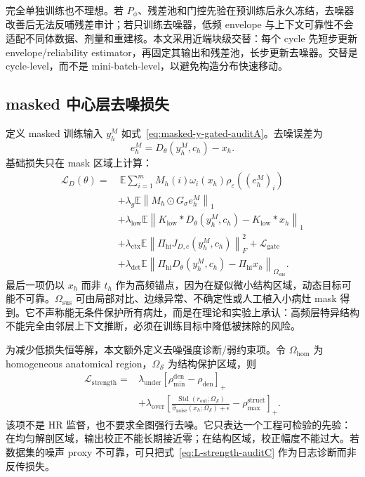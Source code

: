 \documentclass[11pt,a4paper,UTF8,fontset=fandol]{ctexart}
\theoremstyle{definition}
\DeclareMathOperator{\Std}{Std}
\newcommand{\norm}[1]{\left\lVert#1\right\rVert}
\newcommand{\E}{\mathbb{E}}
\newcommand{\cL}{\mathcal{L}}
\begin{document}
完全单独训练也不理想。若 $P_\phi$、残差池和门控先验在预训练后永久冻结，去噪器改善后无法反哺残差审计；若只训练去噪器，低频 envelope 与上下文可靠性不会适配不同体数据、剂量和重建核。本文采用近端块级交替：每个 cycle 先短步更新 envelope/reliability estimator，再固定其输出和残差池，长步更新去噪器。交替是 cycle-level，而不是 mini-batch-level，以避免构造分布快速移动。
\subsection{masked 中心层去噪损失}

定义 masked 训练输入 $y_h^M$ 如式~\eqref{eq:masked-y-gated-auditA}。去噪误差为
\begin{equation}
    e_h^M=D_\theta(y_h^M,c_h)-x_h.
\end{equation}
基础损失只在 mask 区域上计算：
\begin{equation}
\label{eq:LD-def-coreA}
\begin{aligned}
\cL_D(\theta)
=&\ \E\sum_{i=1}^m M_h(i)\omega_i(x_h)\rho_\varepsilon((e_h^M)_i)\\
&+\lambda_g\E\norm{M_h\odot G_\sigma e_h^M}_1\\
&+\lambda_{\mathrm{low}}\E\norm{K_{\mathrm{low}}*D_\theta(y_h^M,c_h)-K_{\mathrm{low}}*x_h}_1\\
&+\lambda_{\mathrm{ctx}}\E\norm{\Pi_{\mathrm{hi}}J_{D,c}(y_h^M,c_h)}_F^2
+\cL_{\mathrm{gate}}\\
&+\lambda_{\mathrm{det}}\E\norm{\Pi_{\mathrm{hi}}D_\theta(y_h^M,c_h)-\Pi_{\mathrm{hi}}x_h}_{\Omega_{\mathrm{sus}}}.
\end{aligned}
\end{equation}
最后一项仍以 $x_h$ 而非 $t_h$ 作为高频锚点，因为在疑似微小结构区域，动态目标可能不可靠。$\Omega_{\mathrm{sus}}$ 可由局部对比、边缘异常、不确定性或人工植入小病灶 mask 得到。它不声称能无条件保护所有病灶，而是在理论和实验上承认：高频层特异结构不能完全由邻层上下文推断，必须在训练目标中降低被抹除的风险。


为减少低损失恒等解，本文额外定义去噪强度诊断/弱约束项。令 $\Omega_{\mathrm{hom}}$ 为 homogeneous anatomical region，$\Omega_{\mathcal S}$ 为结构保护区域，则
\begin{equation}
\label{eq:L-strength-auditC}
\begin{aligned}
\cL_{\mathrm{strength}}
={}&\lambda_{\mathrm{under}}\left[\rho_{\min}^{\mathrm{den}}-\rho_{\mathrm{den}}\right]_+\\
&+\lambda_{\mathrm{over}}\left[\frac{\Std(r_{\mathrm{out}};\Omega_{\mathcal S})}{\widehat\sigma_{\mathrm{noise}}(x_h;\Omega_{\mathcal S})+\epsilon}-\rho_{\max}^{\mathrm{struct}}\right]_+ .
\end{aligned}
\end{equation}
该项不是 HR 监督，也不要求全图强行去噪。它只表达一个工程可检验的先验：在均匀解剖区域，输出校正不能长期接近零；在结构区域，校正幅度不能过大。若数据集的噪声 proxy 不可靠，可只把式~\eqref{eq:L-strength-auditC} 作为日志诊断而非反传损失。
\end{document}
